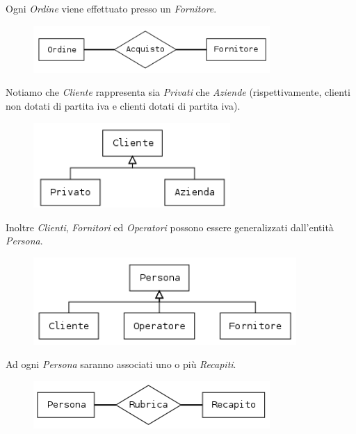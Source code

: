 		Ogni \emph{Ordine} viene effettuato presso un \emph{Fornitore}.
		
		\begin{figure}[H]
			\centering
			\includegraphics[width=9cm]{images/diagrams/ordine_fornitore.png}
		\end{figure}
		
		Notiamo che \emph{Cliente} rappresenta sia \emph{Privati} che \emph{Aziende} (rispettivamente, clienti non dotati di partita iva e clienti dotati di partita iva).
		
		\begin{figure}[H]
			\centering
			\includegraphics[width=7.5cm]{images/diagrams/cliente.png}
		\end{figure}
		
		Inoltre \emph{Clienti}, \emph{Fornitori} ed \emph{Operatori} possono essere generalizzati dall'entità \emph{Persona}.
		
		\begin{figure}[H]
			\centering
			\includegraphics[width=10cm]{images/diagrams/persona.png}
		\end{figure}
		
		Ad ogni \emph{Persona} saranno associati uno o più \emph{Recapiti}.
		
		\begin{figure}[H]
			\centering
			\includegraphics[width=9cm]{images/diagrams/persona_recapito.png}
		\end{figure}
		

